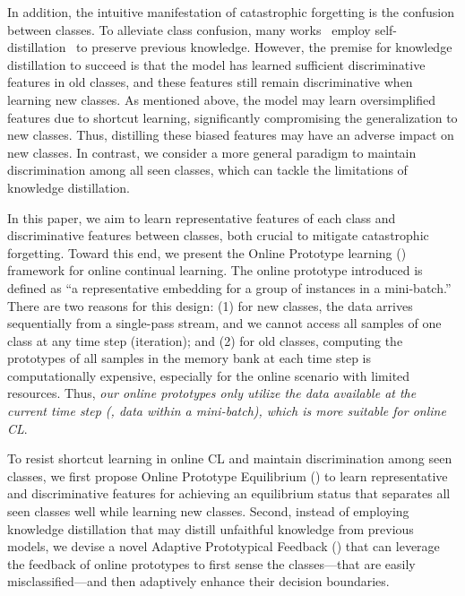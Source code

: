 In addition, 
the intuitive manifestation of catastrophic forgetting is the confusion between classes. 
To alleviate class confusion, many works~\cite{OCM, kd1, iCaRL, DER++, Co2L, protoAug} employ self-distillation~\cite{kd_work, kd_work2} to preserve previous knowledge.
However, the premise for knowledge distillation to succeed is that the model has learned sufficient discriminative features in old classes, and these features still remain discriminative when learning new classes. As mentioned above, the model may learn  oversimplified features due to shortcut learning, significantly compromising the generalization to new classes.
Thus, distilling these biased features may have an adverse impact on new classes. 
In contrast, we consider a more general paradigm to maintain discrimination among all seen classes, which can tackle the limitations of knowledge distillation.



In this paper, we aim to learn representative features of each class and discriminative features between classes, both crucial to mitigate catastrophic forgetting.
Toward this end, we present the Online Prototype learning (\frameworkName) framework for online continual learning.
The online prototype introduced is defined as ``a representative embedding for a group of instances in a mini-batch.'' There are two reasons for this design: (1) for new classes, the data arrives sequentially from a single-pass stream, and we cannot access all samples of one class at any time step (iteration); and (2) for old classes, computing the prototypes of all samples in the memory bank at each time step is computationally expensive, especially for the online scenario with limited resources. 
Thus, \emph{our online prototypes only utilize the data available at the current time step (\ie, data within a mini-batch), which is more suitable for online CL}. 



To resist shortcut learning in online CL and maintain discrimination among seen classes, we first propose Online Prototype Equilibrium (\methodname) to learn representative and discriminative features for achieving an equilibrium status that separates all seen classes well while learning new classes.
Second, 
instead of employing knowledge distillation that may distill unfaithful knowledge from previous models,
we devise a novel Adaptive Prototypical Feedback (\dataaugname) 
that can leverage the feedback of online prototypes to first sense the classes---that are easily misclassified---and then adaptively enhance their decision boundaries.


